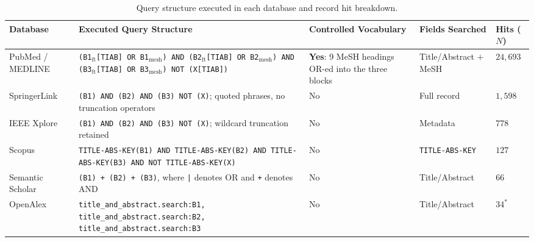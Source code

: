\documentclass[review,authoryear]{elsarticle}
\begin{document}
\begin{table}[t]
\centering
\caption{Query structure executed in each database and record hit breakdown.}
\label{tab:queries}
\footnotesize
\setlength{\tabcolsep}{3.5pt}
\renewcommand{\arraystretch}{1.3}
\begin{tabular}{>{\raggedright\arraybackslash}p{} >{\raggedright\arraybackslash}p{} >{\raggedright\arraybackslash}p{} >{\raggedright\arraybackslash}p{} >{\raggedright\arraybackslash}p{}}
\hline
\textbf{Database} & \textbf{Executed Query Structure} & \textbf{Controlled Vocabulary} & \textbf{Fields Searched} & \textbf{Hits ($N$)} \\
\hline

PubMed / MEDLINE &
\texttt{(B1$_{\text{ft}}$[TIAB] OR B1$_{\text{mesh}}$) AND (B2$_{\text{ft}}$[TIAB] OR B2$_{\text{mesh}}$) AND (B3$_{\text{ft}}$[TIAB] OR B3$_{\text{mesh}}$) NOT (X[TIAB])} &
\textbf{Yes}: 9 MeSH headings OR-ed into the three blocks &
Title/Abstract $+$ MeSH & $24{,}693$ \\
\hline

SpringerLink &
\texttt{(B1) AND (B2) AND (B3) NOT (X)}; quoted phrases, no truncation operators &
No & Full record & $1{,}598$ \\
\hline

IEEE Xplore &
\texttt{(B1) AND (B2) AND (B3) NOT (X)}; wildcard truncation retained &
No & Metadata & $778$ \\
\hline

Scopus &
\texttt{TITLE-ABS-KEY(B1) AND TITLE-ABS-KEY(B2) AND TITLE-ABS-KEY(B3) AND NOT TITLE-ABS-KEY(X)} &
No & \texttt{TITLE-ABS-KEY} & $127$ \\
\hline

Semantic Scholar &
\texttt{(B1) + (B2) + (B3)}, where \texttt{|} denotes OR and \texttt{+} denotes AND &
No & Title/Abstract & $66$ \\
\hline

OpenAlex &
\texttt{title\_and\_abstract.search:B1, title\_and\_abstract.search:B2, title\_and\_abstract.search:B3} &
No & Title/Abstract & $34^{*}$ \\
\hline


\end{tabular}
\end{table}
\end{document}
